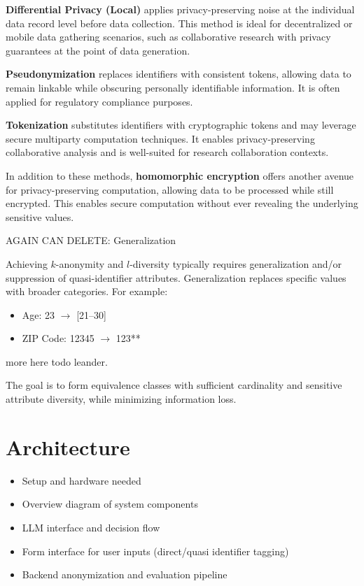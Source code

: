 \documentclass{article}
\begin{document}
\textbf{Differential Privacy (Local)} applies privacy-preserving noise at the individual data record level before data collection. This method is ideal for decentralized or mobile data gathering scenarios, such as collaborative research with privacy guarantees at the point of data generation.

\textbf{Pseudonymization} replaces identifiers with consistent tokens, allowing data to remain linkable while obscuring personally identifiable information. It is often applied for regulatory compliance purposes.

\textbf{Tokenization} substitutes identifiers with cryptographic tokens and may leverage secure multiparty computation techniques. It enables privacy-preserving collaborative analysis and is well-suited for research collaboration contexts.

In addition to these methods, \textbf{homomorphic encryption} offers another avenue for privacy-preserving computation, allowing data to be processed while still encrypted. This enables secure computation without ever revealing the underlying sensitive values.

AGAIN CAN DELETE: Generalization

Achieving $k$-anonymity and $l$-diversity typically requires generalization and/or suppression of quasi-identifier attributes. Generalization replaces specific values with broader categories. For example:
\begin{itemize}
\item Age: 23 $\rightarrow$ [21--30]
\item ZIP Code: 12345 $\rightarrow$ 123**
\end{itemize}
more here todo leander. 


The goal is to form equivalence classes with sufficient cardinality and sensitive attribute diversity, while minimizing information loss.





\section{Architecture}
\begin{itemize}
    \item Setup and hardware needed
    \item Overview diagram of system components
    \item LLM interface and decision flow
    \item Form interface for user inputs (direct/quasi identifier tagging)
    \item Backend anonymization and evaluation pipeline
\end{itemize}
\end{document}
